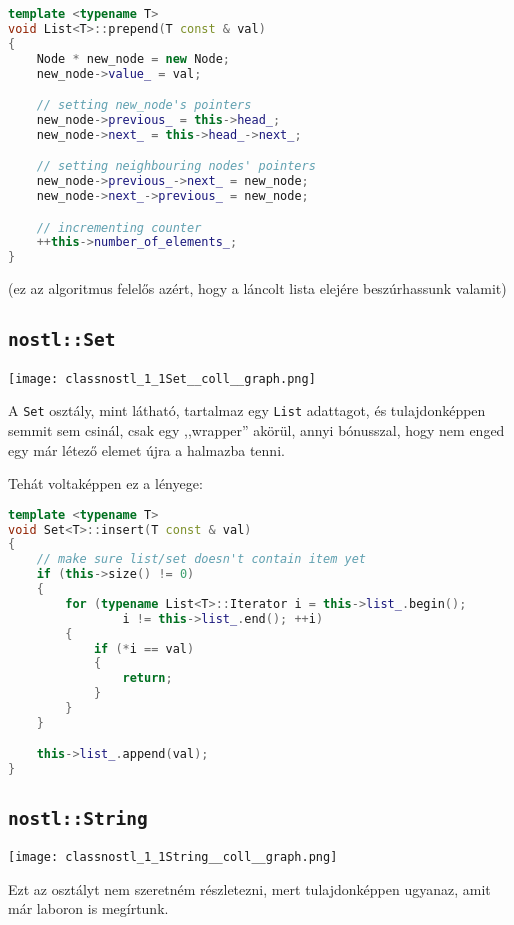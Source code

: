\documentclass[a4paper]{article}
\begin{document}
\begin{lstlisting}[language=C++]
template <typename T>
void List<T>::prepend(T const & val)
{
	Node * new_node = new Node;
	new_node->value_ = val;

	// setting new_node's pointers
	new_node->previous_ = this->head_;
	new_node->next_ = this->head_->next_;

	// setting neighbouring nodes' pointers
	new_node->previous_->next_ = new_node;
	new_node->next_->previous_ = new_node;

	// incrementing counter
	++this->number_of_elements_;
}
\end{lstlisting}

(ez az algoritmus felelős azért, hogy a láncolt lista elejére beszúrhassunk
valamit)

\subsection*{\texttt{nostl::Set}}

\begin{center}
\texttt{[image: classnostl\_1\_1Set\_\_coll\_\_graph.png]}
\end{center}

A \texttt{Set} osztály, mint látható, tartalmaz egy \texttt{List} adattagot, és
tulajdonképpen semmit sem csinál, csak egy ,,wrapper'' akörül, annyi bónusszal,
hogy nem enged egy már létező elemet újra a halmazba tenni.

Tehát voltaképpen ez a lényege:

\begin{lstlisting}[language=C++]
template <typename T>
void Set<T>::insert(T const & val)
{
	// make sure list/set doesn't contain item yet
	if (this->size() != 0)
	{
		for (typename List<T>::Iterator i = this->list_.begin();
				i != this->list_.end(); ++i)
		{
			if (*i == val)
			{
				return;
			}
		}
	}

	this->list_.append(val);
}
\end{lstlisting}

\subsection*{\texttt{nostl::String}}

\begin{center}
\texttt{[image: classnostl\_1\_1String\_\_coll\_\_graph.png]}
\end{center}

Ezt az osztályt nem szeretném részletezni, mert tulajdonképpen ugyanaz, amit már
laboron is megírtunk.
\end{document}
